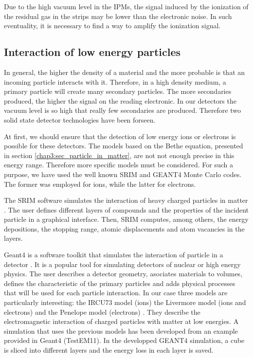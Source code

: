 \begin{refsection}
  

  Due to the high vacuum level in the IPMs, the signal induced by the ionization of the residual gas in the strips may be lower than the  electronic noise. In such eventuality, it is necessary to find a way to amplify the ionization signal.

  \subsection{Interaction of low energy particles}
  \label{chap3:low_energy}
  In general, the higher the density of a material and the more probable is that an incoming particle interacts with it. Therefore, in a high density medium, a primary particle will create many secondary particles. The more secondaries produced, the higher the signal on the reading electronic. In our detectors the vacuum level is so high that really few secondaries are produced. Therefore two solid state detector technologies have been forseen.

  At first, we should ensure that the detection of low energy ions or electrons is possible for these detectors. The models based on the Bethe equation, presented in section \ref{chap3:sec_particle_in_matter}, are not not enough precise in this energy range. Therefore more specific models must be considered. For such a purpose, we have used the well known SRIM and GEANT4 Monte Carlo codes. The former was employed for ions, while the latter for electrons.

  The SRIM software simulates the interaction of heavy charged particles in matter \cite{srim2013}. The user defines different layers of compounds and the properties of the incident particle in a graphical interface. Then, SRIM computes, among others, the energy depositions, the stopping range, atomic displacements and atom vacancies in the layers.

  Geant4 is a software toolkit that simulates the interaction of particle in a detector \cite{Allison2006, Allison2016}. It is a popular tool for simulating detectors of nuclear or high energy physics. The user describes a detector geometry, asociates materials to volumes, defines the characteristic of the primary particles and adds physical processes that will be used for each particle interaction.
  In our case three models are particularly interesting: the IRCU73 model (ions) the Livermore model (ions and electrons) and the Penelope model (electrons) \cite{Bimbot73,livermore97, salvat2009}. They describe the electromagnetic interaction of charged particles with matter at low energies. A simulation that uses the previous models has been developed from an example provided in Geant4 (TestEM11). In the developped GEANT4 simulation, a cube is sliced into different layers and the energy loss in each layer is saved.


\end{refsection}
